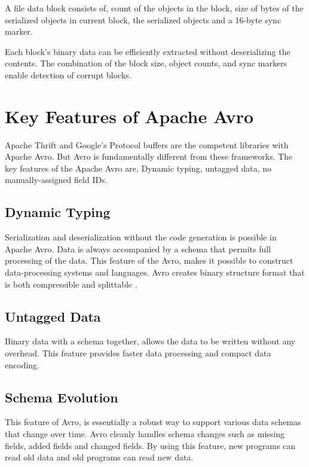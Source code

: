\documentclass[9pt,twocolumn,twoside]{../../styles/osajnl}
\begin{document}
A file data block consists of, count of the objects in the block, size
of bytes of the serialized objects in current block, the serialized
objects and a 16-byte sync marker\cite{www-wiki-avro}.

Each block’s binary data can be efficiently extracted without
deserializing the contents. The combination of the block size, object
counts, and sync markers enable detection of corrupt blocks.


\section{Key Features of Apache Avro}

Apache Thrift and Google’s Protocol buffers are the competent
libraries with Apache Avro. But Avro is fundamentally different from
these frameworks. The key features of the Apache Avro are, Dynamic
typing, untagged data, no manually-assigned field IDs.

\subsection{Dynamic Typing}

Serialization and deserialization without the code generation is
possible in Apache Avro. Data is always accompanied by a schema that
permits full processing of the data. This feature of the Avro, makes
it possible to construct data-processing systems and languages. Avro
creates binary structure format that is both compressible and
splittable \cite{www-tutorialspoint-avro}.

\subsection{Untagged Data}

Binary data with a schema together, allows the data to be written
without any overhead. This feature provides faster data processing and
compact data encoding.

\subsection{Schema Evolution}

This feature of Avro, is essentially a robust way to support various
data schemas that change over time.  Avro cleanly handles schema
changes such as missing fields, added fields and changed fields. By
using this feature, new programs can read old data and old programs
can read new data.
\end{document}
